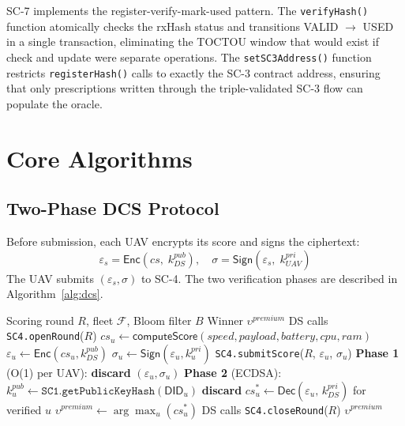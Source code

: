 \documentclass[sigplan,screen,review=false]{acmart}
\begin{document}
SC-7 implements the register-verify-mark-used pattern. The
\texttt{verifyHash()} function atomically checks the rxHash status and
transitions VALID $\to$ USED in a single transaction, eliminating the
TOCTOU window that would exist if check and update were separate
operations. The \texttt{setSC3Address()} function restricts
\texttt{registerHash()} calls to exactly the SC-3 contract address,
ensuring that only prescriptions written through the triple-validated
SC-3 flow can populate the oracle.

\section{Core Algorithms}
\label{sec:algorithms}

\subsection{Two-Phase DCS Protocol}

Before submission, each UAV encrypts its score and signs the
ciphertext:
\[
  \varepsilon_s = \mathsf{Enc}(cs,\; k^{pub}_{DS}), \quad
  \sigma = \mathsf{Sign}(\varepsilon_s,\; k^{pri}_{UAV})
\]
The UAV submits $(\varepsilon_s, \sigma)$ to SC-4. The two verification
phases are described in Algorithm~\ref{alg:dcs}.

\begin{algorithm}[h]
\caption{Two-Phase DCS Selection}
\label{alg:dcs}
\begin{algorithmic}[1]
\Require Scoring round $R$, fleet $\mathcal{F}$, Bloom filter $B$
\Ensure Winner $\upsilon^{premium}$
\State DS calls \texttt{SC4.openRound}($R$)
  \State $cs_u \leftarrow \mathsf{computeScore}(speed, payload, battery, cpu, ram)$
  \State $\varepsilon_u \leftarrow \mathsf{Enc}(cs_u, k^{pub}_{DS})$
  \State $\sigma_u \leftarrow \mathsf{Sign}(\varepsilon_u, k^{pri}_u)$
  \State \texttt{SC4.submitScore}($R$, $\varepsilon_u$, $\sigma_u$)
\EndFor
\State \textbf{Phase 1} (O(1) per UAV):
    \textbf{discard} $(\varepsilon_u, \sigma_u)$
  \EndIf
\EndFor
\State \textbf{Phase 2} (ECDSA):
  \State $k^{pub}_u \leftarrow \texttt{SC1.getPublicKeyHash}(\mathsf{DID}_u)$
    \textbf{discard}
  \EndIf
\EndFor
\State $cs^*_u \leftarrow \mathsf{Dec}(\varepsilon_u,\, k^{pri}_{DS})$ for verified $u$
\State $\upsilon^{premium} \leftarrow \arg\max_{u}(cs^*_u)$
\State DS calls \texttt{SC4.closeRound}($R$)
\State \Return $\upsilon^{premium}$
\end{algorithmic}
\end{algorithm}
\end{document}
